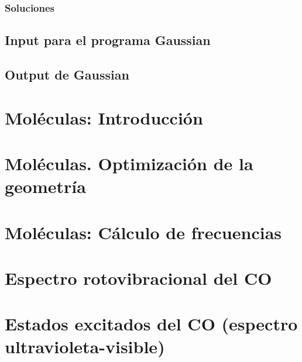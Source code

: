 \documentclass{tufte-book}
\begin{document}
\subsection{Soluciones}
\section{Input para el programa Gaussian}
\section{Output de Gaussian}

\chapter{Moléculas: Introducción}

\chapter{Moléculas. Optimización de la geometría}

\chapter{Moléculas: Cálculo de frecuencias}

\chapter{Espectro rotovibracional del CO}

\chapter{Estados excitados del CO (espectro ultravioleta-visible)}



%
%
\end{document}
